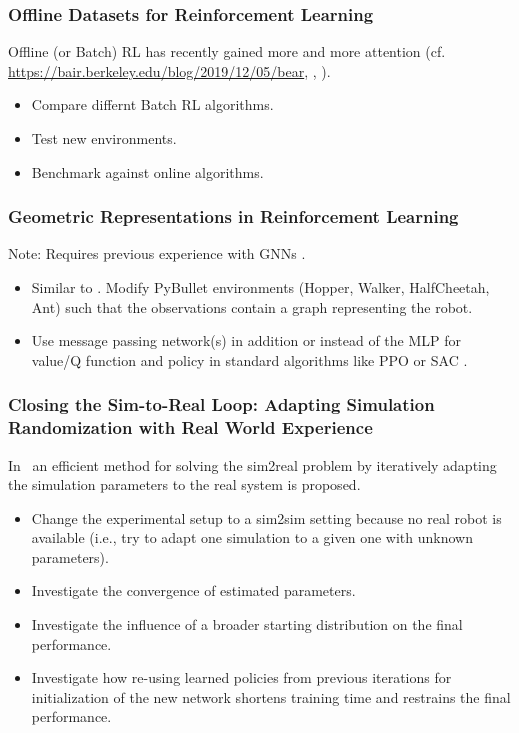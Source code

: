 \documentclass[a4paper]{article}
\begin{document}
\subsubsection{Offline Datasets for Reinforcement Learning}
Offline (or Batch) RL has recently gained more and more attention (cf. \url{https://bair.berkeley.edu/blog/2019/12/05/bear}, \cite{Agarwal2019}, \cite{nair2020}).
\begin{itemize}
  \item Compare differnt Batch RL algorithms.
  \item Test new environments.
  \item Benchmark against online algorithms.
\end{itemize}

\subsubsection{Geometric Representations in Reinforcement Learning}
Note: Requires previous experience with GNNs \cite{kipf2016semisupervised}.
\begin{itemize}
  \item Similar to \cite{Wang2018nervenet}. Modify PyBullet environments (Hopper, Walker, HalfCheetah, Ant) such that the observations contain a graph representing the robot.
  \item Use message passing network(s) in addition or instead of the MLP for value/Q function and policy in standard algorithms like PPO \cite{Schulman2017} or SAC \cite{Haarnoja2018a}.
\end{itemize}

\subsubsection{Closing the Sim-to-Real Loop: Adapting Simulation Randomization with Real World Experience}
In~\cite{Chebotar2018} an efficient method for solving the sim2real problem by iteratively adapting the simulation parameters to the real system is proposed.
\begin{itemize}
\item Change the experimental setup to a sim2sim setting because no real robot is available (i.e., try to adapt one simulation to a given one with unknown parameters).
\item Investigate the convergence of estimated parameters.
\item Investigate the influence of a broader starting distribution on the final performance.
\item Investigate how re-using learned policies from previous iterations for initialization of the new network shortens training time and restrains the final performance.
\end{itemize}
\end{document}
